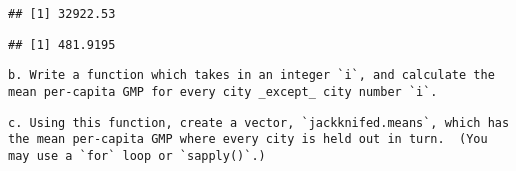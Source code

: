 \documentclass[
]{article}
\newenvironment{Shaded}{\begin{snugshade}}{\end{snugshade}}
\newcommand{\ControlFlowTok}[1]{\textcolor[rgb]{0.13,0.29,0.53}{\textbf{#1}}}
\newcommand{\DataTypeTok}[1]{\textcolor[rgb]{0.13,0.29,0.53}{#1}}
\newcommand{\DecValTok}[1]{\textcolor[rgb]{0.00,0.00,0.81}{#1}}
\newcommand{\KeywordTok}[1]{\textcolor[rgb]{0.13,0.29,0.53}{\textbf{#1}}}
\newcommand{\NormalTok}[1]{#1}
\newcommand{\OperatorTok}[1]{\textcolor[rgb]{0.81,0.36,0.00}{\textbf{#1}}}
\begin{document}
\begin{Shaded}
\end{Shaded}

\begin{verbatim}
## [1] 32922.53
\end{verbatim}

\begin{Shaded}
\end{Shaded}

\begin{verbatim}
## [1] 481.9195
\end{verbatim}

\begin{verbatim}
b. Write a function which takes in an integer `i`, and calculate the mean per-capita GMP for every city _except_ city number `i`.
\end{verbatim}

\begin{Shaded}
\end{Shaded}

\begin{verbatim}
c. Using this function, create a vector, `jackknifed.means`, which has the mean per-capita GMP where every city is held out in turn.  (You may use a `for` loop or `sapply()`.)
\end{verbatim}

\begin{Shaded}
\end{Shaded}
\end{document}
